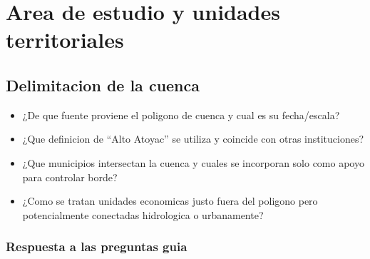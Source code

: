 \documentclass[11pt,letterpaper]{article}
\begin{document}
\section{Area de estudio y unidades territoriales}

\subsection{Delimitacion de la cuenca}
\begin{preguntas}
\begin{itemize}
    \item ¿De que fuente proviene el poligono de cuenca y cual es su fecha/escala?
    \item ¿Que definicion de ``Alto Atoyac'' se utiliza y coincide con otras instituciones?
    \item ¿Que municipios intersectan la cuenca y cuales se incorporan solo como apoyo para controlar borde?
    \item ¿Como se tratan unidades economicas justo fuera del poligono pero potencialmente conectadas hidrologica o urbanamente?
\end{itemize}
\end{preguntas}

\subsubsection*{Respuesta a las preguntas guia}
\end{document}
